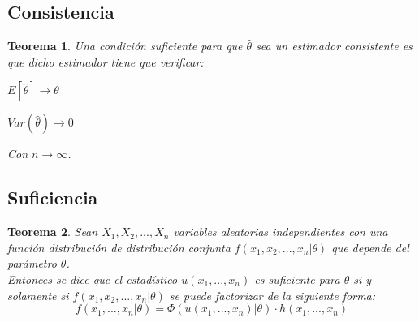 \documentclass[a4paper, 10pt]{article} %
\newtheorem{theorem}{Teorema}[section]
\begin{document}
\subsection{Consistencia}
\begin{theorem}
Una condición suficiente para que $\hat{\theta}$ sea un estimador consistente es que dicho estimador tiene que verificar:
\begin{description}
\item $E[\hat{\theta}] \rightarrow \theta$
\item $Var(\hat{\theta}) \rightarrow 0$
\end{description}
Con $n \rightarrow \infty$.
\end{theorem}


\subsection{Suficiencia}

\begin{theorem}
Sean $X_1, X_2, ..., X_n$ variables aleatorias independientes con una función distribución de distribución conjunta $f(x_1, x_2, ..., x_n | \theta)$ que depende del parámetro $\theta$. \\
Entonces se dice que el estadístico $u(x_1, ..., x_n)$ es suficiente para $\theta$ si y solamente si $f(x_1, x_2, ..., x_n | \theta)$ se puede factorizar de la siguiente forma: \\
$$ f(x_1,...,x_n| \theta) = \Phi(u(x_1, ..., x_n) | \theta)\cdot h(x_1, ..., x_n) $$
\end{theorem}
\end{document}
